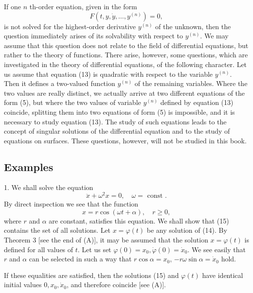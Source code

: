 \documentclass[10pt,a5paper]{book}
\theoremstyle{plain}
\theoremstyle{definition}
\theoremstyle{remark}
\begin{document}
If one $n$ th-order equation, given in the form
\begin{equation*}
F\left(t, y, \dot{y}, \ldots, y^{(n)}\right)=0, \tag{13}
\end{equation*}
is not solved for the highest-order derivative $y^{(n)}$ of the unknown, then the question immediately arises of its solvability with respect to $y^{(n)}$. We may assume that this question does not relate to the field of differential equations, but rather to the theory of functions. There arise, however, some questions, which are investigated in the theory of differential equations, of the following character. Let us assume that equation (13) is quadratic with respect to the variable $y^{(n)}$. Then it defines a two-valued function $y^{(n)}$ of the remaining variables. Where the two values are really distinct, we actually arrive at two different equations of the form (5), but where the two values of variable $y^{(n)}$ defined by equation (13) coincide, splitting them into two equations of form (5) is impossible, and it is necessary to study equation (13). The study of such equations leads to the concept of singular solutions of the differential equation and to the study of equations on surfaces. These questions, however, will not be studied in this book.

\subsection*{Examples}
1. We shall solve the equation
\begin{equation*}
\ddot{x}+\omega^{2} x=0, \quad \omega=\text { const } . \tag{14}
\end{equation*}
By direct inspection we see that the function
\begin{equation*}
x=r \cos (\omega t+\alpha), \quad r \geq 0, \tag{15}
\end{equation*}
where $r$ and $\alpha$ are constant, satisfies this equation. We shall show that (15) contains the set of all solutions. Let $x=\varphi(t)$ be any solution of (14). By Theorem 3 [see the end of (A)], it may be assumed that the solution $x=\varphi(t)$ is defined for all values of $t$. Let us set $\varphi(0)=x_{0}, \dot{\varphi}(0)=\dot{x}_{0}$. We see easily that $r$ and $\alpha$ can be selected in such a way that $r \cos \alpha=x_{0}$, $-r \omega \sin \alpha=\dot{x}_{0}$ hold.

If these equalities are satisfied, then the solutions (15) and $\varphi(t)$ have identical initial values $0, x_{0}, \dot{x}_{0}$, and therefore coincide [see (A)].
\end{document}
